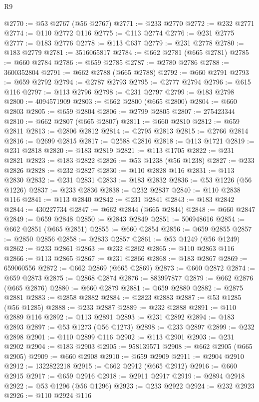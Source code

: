 \begin{lexlean}{R9}
\begin{coremodule}
@2770 := @53 @2767 (@56 @2767)
@2771 := @233 @2770
@2772 := @232 @2771
@2774 := @110 @2772 @116
@2775 := @113 @2774
@2776 := @231 @2775
@2777 := @183 @2776
@2778 := @113 @637
@2779 := @231 @2778
@2780 := @183 @2779
@2781 := 3516065817
@2784 := @662 @2781 (@665 @2781)
@2785 := @660 @2784
@2786 := @659 @2785
@2787 := @2780 @2786
@2788 := 3600352804
@2791 := @662 @2788 (@665 @2788)
@2792 := @660 @2791
@2793 := @659 @2792
@2794 := @2787 @2793
@2795 := @2777 @2794
@2796 := @615 @116
@2797 := @113 @2796
@2798 := @231 @2797
@2799 := @183 @2798
@2800 := 4094571909
@2803 := @662 @2800 (@665 @2800)
@2804 := @660 @2803
@2805 := @659 @2804
@2806 := @2799 @2805
@2807 := 275423344
@2810 := @662 @2807 (@665 @2807)
@2811 := @660 @2810
@2812 := @659 @2811
@2813 := @2806 @2812
@2814 := @2795 @2813
@2815 := @2766 @2814
@2816 := @2699 @2815
@2817 := @2588 @2816
@2818 := @113 @1721
@2819 := @231 @2818
@2820 := @183 @2819
@2821 := @113 @1705
@2822 := @231 @2821
@2823 := @183 @2822
@2826 := @53 @1238 (@56 @1238)
@2827 := @233 @2826
@2828 := @232 @2827
@2830 := @110 @2828 @116
@2831 := @113 @2830
@2832 := @231 @2831
@2833 := @183 @2832
@2836 := @53 @1226 (@56 @1226)
@2837 := @233 @2836
@2838 := @232 @2837
@2840 := @110 @2838 @116
@2841 := @113 @2840
@2842 := @231 @2841
@2843 := @183 @2842
@2844 := 430227734
@2847 := @662 @2844 (@665 @2844)
@2848 := @660 @2847
@2849 := @659 @2848
@2850 := @2843 @2849
@2851 := 506948616
@2854 := @662 @2851 (@665 @2851)
@2855 := @660 @2854
@2856 := @659 @2855
@2857 := @2850 @2856
@2858 := @2833 @2857
@2861 := @53 @1249 (@56 @1249)
@2862 := @233 @2861
@2863 := @232 @2862
@2865 := @110 @2863 @116
@2866 := @113 @2865
@2867 := @231 @2866
@2868 := @183 @2867
@2869 := 659060556
@2872 := @662 @2869 (@665 @2869)
@2873 := @660 @2872
@2874 := @659 @2873
@2875 := @2868 @2874
@2876 := 883997877
@2879 := @662 @2876 (@665 @2876)
@2880 := @660 @2879
@2881 := @659 @2880
@2882 := @2875 @2881
@2883 := @2858 @2882
@2884 := @2823 @2883
@2887 := @53 @1285 (@56 @1285)
@2888 := @233 @2887
@2889 := @232 @2888
@2891 := @110 @2889 @116
@2892 := @113 @2891
@2893 := @231 @2892
@2894 := @183 @2893
@2897 := @53 @1273 (@56 @1273)
@2898 := @233 @2897
@2899 := @232 @2898
@2901 := @110 @2899 @116
@2902 := @113 @2901
@2903 := @231 @2902
@2904 := @183 @2903
@2905 := 958139571
@2908 := @662 @2905 (@665 @2905)
@2909 := @660 @2908
@2910 := @659 @2909
@2911 := @2904 @2910
@2912 := 1322822218
@2915 := @662 @2912 (@665 @2912)
@2916 := @660 @2915
@2917 := @659 @2916
@2918 := @2911 @2917
@2919 := @2894 @2918
@2922 := @53 @1296 (@56 @1296)
@2923 := @233 @2922
@2924 := @232 @2923
@2926 := @110 @2924 @116

\end{coremodule}
\end{lexlean}

